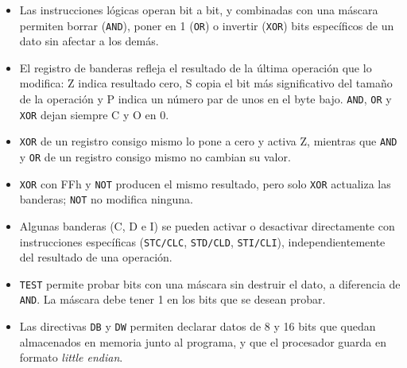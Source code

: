 \documentclass[10pt]{article}
\begin{document}
\begin{itemize}
  \item Las instrucciones lógicas operan bit a bit, y combinadas con una máscara permiten borrar (\texttt{AND}), poner en 1 (\texttt{OR}) o invertir (\texttt{XOR}) bits específicos de un dato sin afectar a los demás.
  \item El registro de banderas refleja el resultado de la última operación que lo modifica: Z indica resultado cero, S copia el bit más significativo del tamaño de la operación y P indica un número par de unos en el byte bajo. \texttt{AND}, \texttt{OR} y \texttt{XOR} dejan siempre C y O en 0.
  \item \texttt{XOR} de un registro consigo mismo lo pone a cero y activa Z, mientras que \texttt{AND} y \texttt{OR} de un registro consigo mismo no cambian su valor.
  \item \texttt{XOR} con FFh y \texttt{NOT} producen el mismo resultado, pero solo \texttt{XOR} actualiza las banderas; \texttt{NOT} no modifica ninguna.
  \item Algunas banderas (C, D e I) se pueden activar o desactivar directamente con instrucciones específicas (\texttt{STC/CLC}, \texttt{STD/CLD}, \texttt{STI/CLI}), independientemente del resultado de una operación.
  \item \texttt{TEST} permite probar bits con una máscara sin destruir el dato, a diferencia de \texttt{AND}. La máscara debe tener 1 en los bits que se desean probar.
  \item Las directivas \texttt{DB} y \texttt{DW} permiten declarar datos de 8 y 16 bits que quedan almacenados en memoria junto al programa, y que el procesador guarda en formato \textit{little endian}.
\end{itemize}
\end{document}

